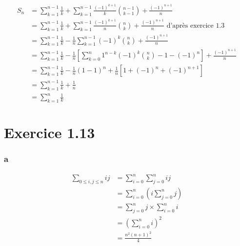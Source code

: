 \documentclass{report}
\begin{document}
\begin{equation*}
	\begin{split}
		S_{n}
		&= 	\sum_{k=1}^{n-1} \frac{1}{k} + \sum_{k=1}^{n-1} \frac{(-1)^{k+1}}{k}\binom{n-1}{k-1} + \frac{(-1)^{n+1}}{n}\\
		&= 	\sum_{k=1}^{n-1} \frac{1}{k} + \sum_{k=1}^{n-1} \frac{(-1)^{k+1}}{n}\binom{n}{k} + \frac{(-1)^{n+1}}{n} \text{ d'après exercice 1.3} \\
		&= 	\sum_{k=1}^{n-1} \frac{1}{k} - \frac{1}{n} \sum_{k=1}^{n-1} (-1)^{k}\binom{n}{k} + \frac{(-1)^{n+1}}{n} \\
		&= 	\sum_{k=1}^{n-1} \frac{1}{k} - \frac{1}{n} \left[ \sum_{k=0}^{n} 1^{n-k}(-1)^{k}\binom{n}{k} - 1 - (-1)^{n} \right] + \frac{(-1)^{n+1}}{n} \\
		&= 	\sum_{k=1}^{n-1} \frac{1}{k} - \frac{1}{n} (1-1)^n + \frac{1}{n} \left[ 1 + (-1)^n +(-1)^{n+1}\right]\\
		&= 	\sum_{k=1}^{n-1} \frac{1}{k} + \frac{1}{n} \\
		&= 	\sum_{k=1}^{n} \frac{1}{k}
	\end{split}
\end{equation*}

\section*{Exercice 1.13}

\subsubsection*{a}
\begin{equation*}
	\begin{split}
		\sum_{0 \le i,j \le n} ij &= \sum_{i=0}^{n} \sum_{j=0}^{n} ij \\
		&= \sum_{i=0}^{n} \left(i \sum_{j=0}^{n} j \right)\\
		&= \sum_{j=0}^{n} j \times \sum_{i=0}^{n} i \\
		&= \left(\sum_{i=0}^{n} i \right)^2 \\
		&= \frac{n^2(n+1)^2}{4}
	\end{split}
\end{equation*}
\end{document}
